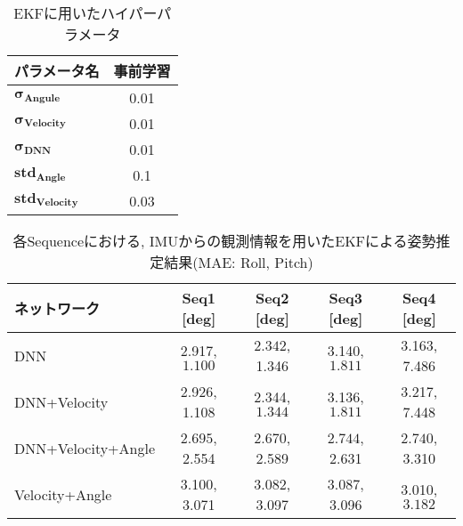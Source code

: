 \begin{table}[htbp]
\begin{center}
\caption{EKFに用いたハイパーパラメータ}
  \begin{tabular}{l | c}\hline
      パラメータ名 &  事前学習 \\ \hline
    $\bm{\sigma_{Angule}}$ & 0.01 \\
    $\bm{\sigma_{Velocity}}$ & 0.01 \\
    $\bm{\sigma_{DNN}}$ & 0.01 \\
    $\bm{std_{Angle}}$ & 0.1 \\
    $\bm{std_{Velocity}}$ & 0.03 \\ \hline
  \end{tabular}
  \label{tab:EKF_Hyperparameter}
\end{center}
\end{table}

\begin{table}[htbp]
\begin{center}
\caption{各Sequenceにおける, IMUからの観測情報を用いたEKFによる姿勢推定結果(MAE: Roll, Pitch)}
  \begin{tabular}{l || c | c | c | c}\hline
      ネットワーク &  Seq1 [deg] & Seq2 [deg] & Seq3 [deg] & Seq4 [deg]\\ \hline
    DNN                & 2.917, $\bm{1.100}$ & $\bm{2.342}$, 1.346 & 3.140, $\bm{1.811}$ & 3.163, 7.486 \\
    DNN+Velocity       & 2.926, 1.108 & 2.344, $\bm{1.344}$ & 3.136, $\bm{1.811}$ & 3.217, 7.448 \\
    DNN+Velocity+Angle & $\bm{2.695}$, 2.554 & 2.670, 2.589 & $\bm{2.744}$, 2.631 & $\bm{2.740}$, 3.310\\
    Velocity+Angle     & 3.100, 3.071 & 3.082, 3.097 & 3.087, 3.096 & 3.010, $\bm{3.182}$\\ \hline
  \end{tabular}
  \label{tab:MAE_frame_infer_3}
\end{center}
\end{table}

